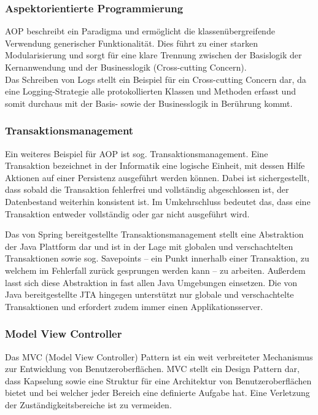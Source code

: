 			\subsubsection{Aspektorientierte Programmierung}
			
				\acs{AOP} beschreibt ein Paradigma und ermöglicht die klassenübergreifende Verwendung generischer Funktionalität. Dies führt zu einer starken Modularisierung und sorgt für eine klare Trennung zwischen der Basislogik der Kernanwendung und der Businesslogik (Cross-cutting Concern). \cite{Wunderlich.2005} \\
				Das Schreiben von Logs stellt ein Beispiel für ein Cross-cutting Concern dar, da eine Logging-Strategie alle protokollierten Klassen und Methoden erfasst und somit durchaus mit der Basis- sowie der Businesslogik in Berührung kommt. 
			
			\subsubsection{Transaktionsmanagement} %
			\label{frameworks.spring.transaktionsmanagement}
			
				Ein weiteres Beispiel für \acs{AOP} ist sog. Transaktionsmanagement. Eine Transaktion bezeichnet in der Informatik eine logische Einheit, mit dessen Hilfe Aktionen auf einer Persistenz ausgeführt werden können. Dabei ist sichergestellt, dass sobald die Transaktion fehlerfrei und vollständig abgeschlossen ist, der Datenbestand weiterhin konsistent ist. Im Umkehrschluss bedeutet das, dass eine Transaktion entweder vollständig oder gar nicht ausgeführt wird. \cite{Ozsu.2011}
			
				Das von Spring bereitgestellte Transaktionsmanagement stellt eine Abstraktion der Java Plattform dar und ist in der Lage mit globalen und verschachtelten Transaktionen sowie sog. Savepoints -- ein Punkt innerhalb einer Transaktion, zu welchem im Fehlerfall zurück gesprungen werden kann -- zu arbeiten. Außerdem lasst sich diese Abstraktion in fast allen Java Umgebungen einsetzen. Die von Java bereitgestellte \ac{JTA} \cite{Oracle.3232020} hingegen unterstützt nur globale und verschachtelte Transaktionen und erfordert zudem immer einen Applikationsserver. 
			
			\subsubsection{Model View Controller} %
			
				Das \acs{MVC} (Model View Controller) Pattern ist ein weit verbreiteter Mechanismus zur Entwicklung von Benutzeroberflächen. \acs{MVC} stellt ein Design Pattern dar, dass Kapselung sowie eine Struktur für eine Architektur von Benutzeroberflächen bietet und bei welcher jeder Bereich eine definierte Aufgabe hat. Eine Verletzung der Zuständigkeitsbereiche ist zu vermeiden. \cite{Gamma.1995}
			
